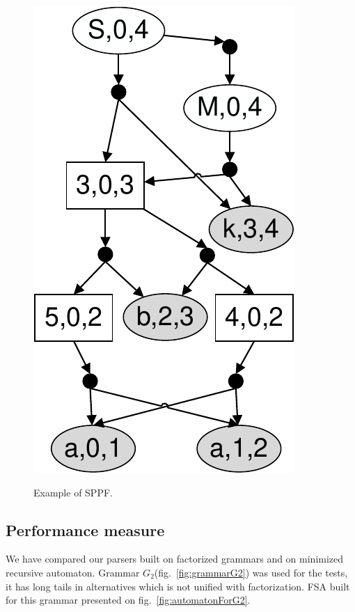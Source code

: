 \documentclass[runningheads,a4paper]{llncs}
\begin{document}
\begin{figure}[H]
{        \includegraphics[scale=.5]{pictures/G1SPPF.pdf}
        \label{fig:SPPFForG1}
    }
    \caption{Example of SPPF.}
\end{figure}


\subsection{Performance measure}

We have compared our parsers built on factorized grammars and on minimized recursive automaton.
Grammar $G_2$(fig.~\ref{fig:grammarG2}) was used for the tests,
it has long tails in alternatives which is not unified with factorization.
FSA built for this grammar presented on fig.~\ref{fig:automatonForG2}.
\end{document}
